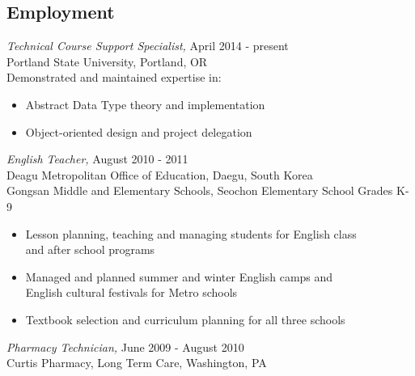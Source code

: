 \documentclass[margin]{res}
\begin{document}
\begin{resume}
 \section{Employment}{\sl Technical Course Support Specialist,} \hfill April 2014 - present\\
 		Portland State University, Portland, OR\\
		Demonstrated and maintained expertise in:
		 \begin{itemize} \itemsep -2pt %
		 \item Abstract Data Type theory and implementation
		 \item Object-oriented design and project delegation
 		\end{itemize}
		{\sl English Teacher,} \hfill August 2010 - 2011\\
                Deagu Metropolitan Office of Education, Daegu, South Korea \\
                Gongsan Middle and Elementary Schools, Seochon Elementary School \hfill Grades K-9
                  \begin{itemize} \itemsep -2pt %
                   \item Lesson planning, teaching and managing students for English class\\
                   and after school programs
                   \item Managed and planned summer and winter English camps and\\ 
                   English cultural festivals for Metro schools
                   \item Textbook selection and curriculum planning for all three schools
                   \end{itemize} 
 
		{\sl Pharmacy Technician,} \hfill June 2009 - August 2010\\
		 Curtis Pharmacy, Long Term Care, Washington, PA
 

\end{resume}
\end{document}
